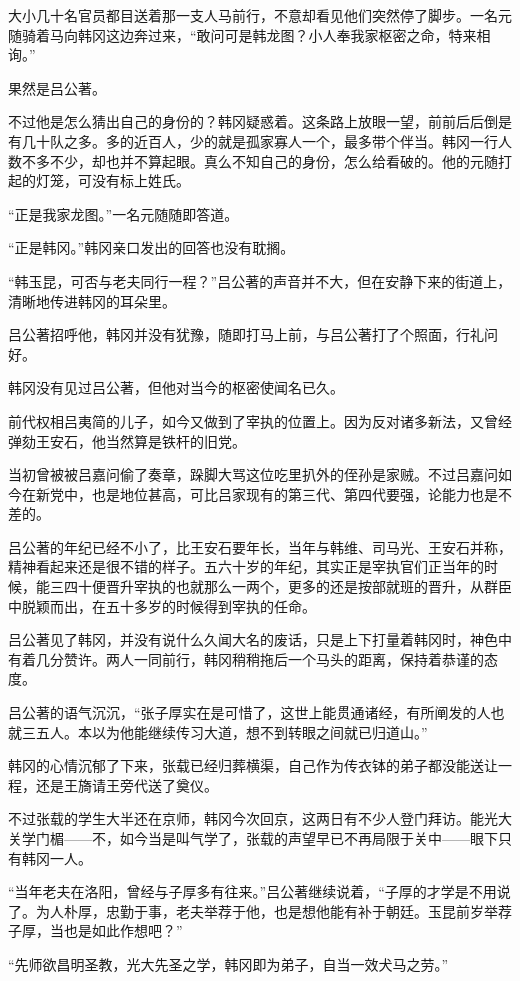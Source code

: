 大小几十名官员都目送着那一支人马前行，不意却看见他们突然停了脚步。一名元随骑着马向韩冈这边奔过来，“敢问可是韩龙图？小人奉我家枢密之命，特来相询。”

果然是吕公著。

不过他是怎么猜出自己的身份的？韩冈疑惑着。这条路上放眼一望，前前后后倒是有几十队之多。多的近百人，少的就是孤家寡人一个，最多带个伴当。韩冈一行人数不多不少，却也并不算起眼。真么不知自己的身份，怎么给看破的。他的元随打起的灯笼，可没有标上姓氏。

“正是我家龙图。”一名元随随即答道。

“正是韩冈。”韩冈亲口发出的回答也没有耽搁。

“韩玉昆，可否与老夫同行一程？”吕公著的声音并不大，但在安静下来的街道上，清晰地传进韩冈的耳朵里。

吕公著招呼他，韩冈并没有犹豫，随即打马上前，与吕公著打了个照面，行礼问好。

韩冈没有见过吕公著，但他对当今的枢密使闻名已久。

前代权相吕夷简的儿子，如今又做到了宰执的位置上。因为反对诸多新法，又曾经弹劾王安石，他当然算是铁杆的旧党。

当初曾被被吕嘉问偷了奏章，跺脚大骂这位吃里扒外的侄孙是家贼。不过吕嘉问如今在新党中，也是地位甚高，可比吕家现有的第三代、第四代要强，论能力也是不差的。

吕公著的年纪已经不小了，比王安石要年长，当年与韩维、司马光、王安石并称，精神看起来还是很不错的样子。五六十岁的年纪，其实正是宰执官们正当年的时候，能三四十便晋升宰执的也就那么一两个，更多的还是按部就班的晋升，从群臣中脱颖而出，在五十多岁的时候得到宰执的任命。

吕公著见了韩冈，并没有说什么久闻大名的废话，只是上下打量着韩冈时，神色中有着几分赞许。两人一同前行，韩冈稍稍拖后一个马头的距离，保持着恭谨的态度。

吕公著的语气沉沉，“张子厚实在是可惜了，这世上能贯通诸经，有所阐发的人也就三五人。本以为他能继续传习大道，想不到转眼之间就已归道山。”

韩冈的心情沉郁了下来，张载已经归葬横渠，自己作为传衣钵的弟子都没能送让一程，还是王旖请王旁代送了奠仪。

不过张载的学生大半还在京师，韩冈今次回京，这两日有不少人登门拜访。能光大关学门楣——不，如今当是叫气学了，张载的声望早已不再局限于关中——眼下只有韩冈一人。

“当年老夫在洛阳，曾经与子厚多有往来。”吕公著继续说着，“子厚的才学是不用说了。为人朴厚，忠勤于事，老夫举荐于他，也是想他能有补于朝廷。玉昆前岁举荐子厚，当也是如此作想吧？”

“先师欲昌明圣教，光大先圣之学，韩冈即为弟子，自当一效犬马之劳。”

